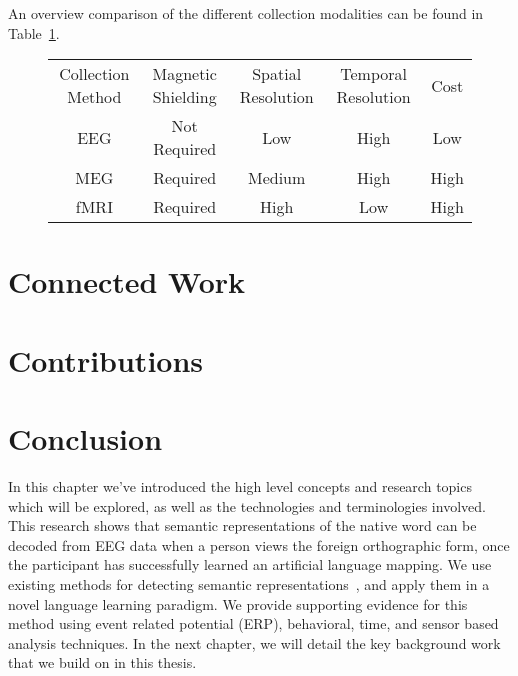 An overview comparison of the different collection modalities can be found in 
Table~\ref{table:modalities}.

\begin{figure}[t]
  \begin{center}
    \begin{tabular}{ |c|c|c|c|c| }
      \hline
        Collection Method & Magnetic Shielding & Spatial Resolution & Temporal 
        Resolution & Cost \\
        EEG & Not Required & Low & High & Low \\
        MEG & Required & Medium & High & High \\
        fMRI & Required & High & Low & High \\
      \hline
    \end{tabular}
  \end{center}
  \label{table:modalities}
\end{figure}

\section{Connected Work}

\section{Contributions}

\section{Conclusion}

In this chapter we've introduced the high level concepts and research topics 
which will be explored, as well as the technologies and terminologies involved.  
This research shows that semantic representations of the native word can be 
decoded from EEG data when a person views the foreign orthographic form, once 
the participant has successfully learned an artificial language mapping.  We 
use existing methods for detecting semantic representations~\cite{Sudre2012}, 
and apply them in a novel language learning paradigm. We provide supporting 
evidence for this method using event related potential (ERP), behavioral, time, 
and sensor based analysis techniques. In the next chapter, we will detail the 
key background work that we build on in this thesis. 
